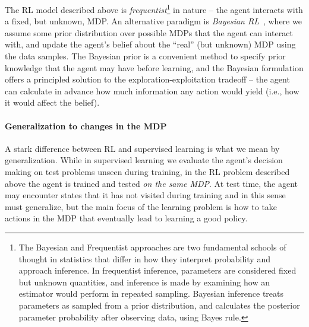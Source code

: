 The RL model described above is \textit{frequentist}\footnote{The Bayesian and Frequentist approaches are two fundamental schools of thought in statistics that differ in how they interpret probability and approach inference. In frequentist inference, parameters are considered fixed but unknown quantities, and inference is made by examining how an estimator would perform in repeated sampling. Bayesian inference treats parameters as sampled from a prior distribution, and calculates the posterior parameter probability after observing data, using Bayes rule.} in nature -- the agent interacts with a fixed, but unknown, MDP. An alternative paradigm is \textit{Bayesian RL}~\cite{ghavamzadeh2015bayesian}, where we assume some prior distribution over possible MDPs that the agent can interact with, and update the agent's belief about the ``real'' (but unknown) MDP using the data samples. The Bayesian prior is a convenient method to specify prior knowledge that the agent may have before learning, and the Bayesian formulation offers a principled solution to the exploration-exploitation tradeoff -- the agent can calculate in advance how much information any action would yield (i.e., how it would affect the belief). 

\paragraph{Generalization to changes in the MDP}
A stark difference between RL and supervised learning is what we mean by generalization. While in supervised learning we evaluate the agent's decision making on test problems unseen during training, in the RL problem described above the agent is trained and tested \textit{on the same MDP}. At test time, the agent may encounter states that it has not visited during training and in this sense must generalize, but the main focus of the learning problem is how to take actions in the MDP that eventually lead to learning a good policy.

